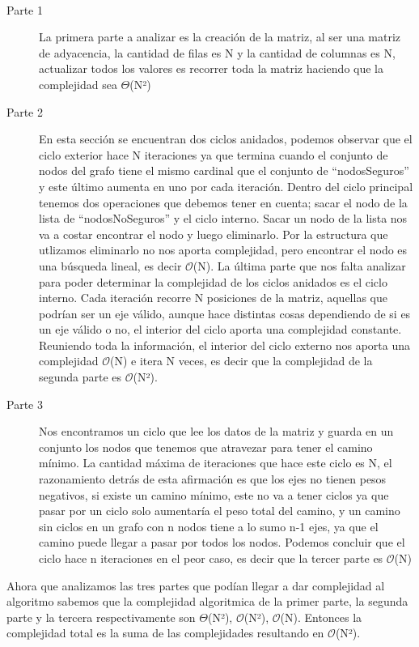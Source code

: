 \documentclass[spanish,12pt]{article}
\begin{document}
\\
\begin{description}
\item[Parte 1] La primera parte a analizar es la creación de la matriz, al ser una matriz de adyacencia, la cantidad de filas es N y la cantidad de columnas es N, actualizar todos los valores es recorrer toda la matriz haciendo que la complejidad sea $\Theta$(N²)
\\
\item[Parte 2] En esta sección se encuentran dos ciclos anidados, podemos observar que el ciclo exterior hace N iteraciones ya que termina cuando el conjunto de nodos del grafo tiene el mismo cardinal que el conjunto de ``nodosSeguros'' y este último aumenta en uno por cada iteración. Dentro del ciclo principal tenemos dos operaciones que debemos tener en cuenta; sacar el nodo de la lista de ``nodosNoSeguros'' y el ciclo interno. Sacar un nodo de la lista nos va a costar encontrar el nodo y luego eliminarlo. Por la estructura que utlizamos eliminarlo no nos aporta complejidad, pero encontrar el nodo es una búsqueda lineal, es decir $\mathcal{O}$(N). La última parte que nos falta analizar para poder determinar la complejidad de los ciclos anidados es el ciclo interno. Cada iteración recorre N posiciones de la matriz, aquellas que podrían ser un eje válido, aunque hace distintas cosas dependiendo de si es un eje válido o no, el interior del ciclo aporta una complejidad constante. Reuniendo toda la información, el interior del ciclo externo nos aporta una complejidad $\mathcal{O}$(N) e itera N veces, es decir que la complejidad de la segunda parte es $\mathcal{O}$(N²).
\\
\item[Parte 3] Nos encontramos un ciclo que lee los datos de la matriz y guarda en un conjunto los nodos que tenemos que atravezar para tener el camino mínimo. La cantidad máxima de iteraciones que hace este ciclo es N, el razonamiento detrás de esta afirmación es que los ejes no tienen pesos negativos, si existe un camino mínimo, este no va a tener ciclos ya que pasar por un ciclo solo aumentaría el peso total del camino, y un camino sin ciclos en un grafo con n nodos tiene a lo sumo n-1 ejes, ya que el camino puede llegar a pasar por todos los nodos. Podemos concluir que el ciclo hace n iteraciones en el peor caso, es decir que la tercer parte es $\mathcal{O}$(N)
\\
\end{description}
\tab Ahora que analizamos las tres partes que podían llegar a dar complejidad al algoritmo sabemos que la complejidad algoritmica de la primer parte, la segunda parte y la tercera respectivamente son $\Theta$(N²), $\mathcal{O}$(N²), $\mathcal{O}$(N). Entonces la complejidad total es la suma de las complejidades resultando en $\mathcal{O}$(N²).
\end{document}
